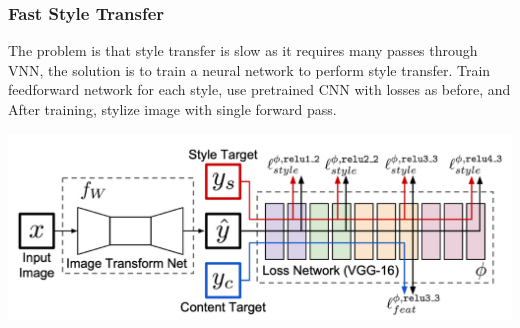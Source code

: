 \subsubsection{Fast Style Transfer}
The problem is that style transfer is slow as it requires many passes through VNN, the solution is to train a neural network to perform style transfer.
Train feedforward network for each style, use pretrained CNN with losses as before, and After training, stylize image with single forward pass.
\begin{center}
	\includegraphics[width=0.7\linewidth]{img/fast_style_transfer}
\end{center}
